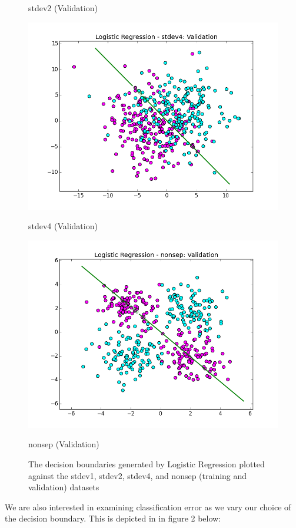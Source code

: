\documentclass[10pt]{article}
\begin{document}
\begin{figure}[ht]
\begin{minipage}[b]{.24\linewidth}
		\caption*{stdev2 (Validation)}
	\end{minipage}
	\begin{minipage}[b]{.24\linewidth}
		\centering
		\includegraphics[width=.5\linewidth, height=.5in]{LR_stdev4_validation.png}
		\caption*{stdev4 (Validation)}
	\end{minipage}
	\begin{minipage}[b]{.24\linewidth}
		\centering
		\includegraphics[width=.5\linewidth, height=.5in]{LR_nonsep_validation.png}
		\caption*{nonsep (Validation)}
	\end{minipage}
	\caption{The decision boundaries generated by Logistic Regression plotted against the stdev1, stdev2, stdev4, and nonsep (training and validation) datasets}
\end{figure}

We are also interested in examining classification error as we vary our choice of the decision boundary. This is depicted in in figure 2 below:
\end{document}
